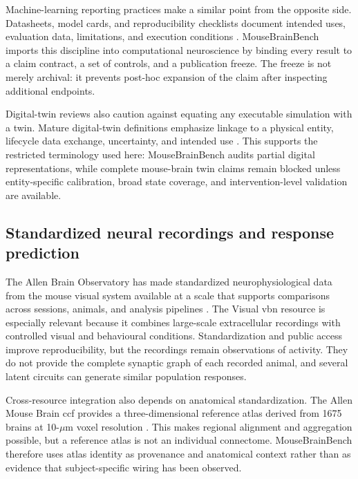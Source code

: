 \documentclass[a4paper,fleqn]{cas-sc}
\begin{document}
Machine-learning reporting practices make a similar point from the opposite
side. Datasheets, model cards, and reproducibility checklists document intended
uses, evaluation data, limitations, and execution conditions
\citep{gebru2021datasheets,mitchell2019modelcards,pineau2021reproducibility}.
MouseBrainBench imports this discipline into computational neuroscience by
binding every result to a claim contract, a set of controls, and a publication
freeze. The freeze is not merely archival: it prevents post-hoc expansion of the
claim after inspecting additional endpoints.

Digital-twin reviews also caution against equating any executable simulation
with a twin. Mature digital-twin definitions emphasize linkage to a physical
entity, lifecycle data exchange, uncertainty, and intended use
\citep{jones2020digitaltwin,rasheed2020digitaltwin,fuller2020digitaltwin,shao2022credibility}.
This supports the restricted terminology used here: MouseBrainBench audits
partial digital representations, while complete mouse-brain twin claims remain
blocked unless entity-specific calibration, broad state coverage, and
intervention-level validation are available.


\subsection{Standardized neural recordings and response prediction}
\label{subsec:recordings-prediction}

The Allen Brain Observatory has made standardized neurophysiological data from
the mouse visual system available at a scale that supports comparisons across
sessions, animals, and analysis pipelines \citep{siegle2021survey}. The Visual
\ac{vbn} resource is especially relevant because it combines
large-scale extracellular recordings with controlled visual and behavioural
conditions. Standardization and public access improve reproducibility, but the
recordings remain observations of activity. They do not provide the complete
synaptic graph of each recorded animal, and several latent circuits can generate
similar population responses.

Cross-resource integration also depends on anatomical standardization. The Allen
Mouse Brain \ac{ccf} provides a three-dimensional reference
atlas derived from 1675 brains at 10-$\mu$m voxel resolution
\citep{wang2020ccf}. This makes regional alignment and aggregation possible,
but a reference atlas is not an individual connectome. MouseBrainBench therefore
uses atlas identity as provenance and anatomical context rather than as evidence
that subject-specific wiring has been observed.
\end{document}
